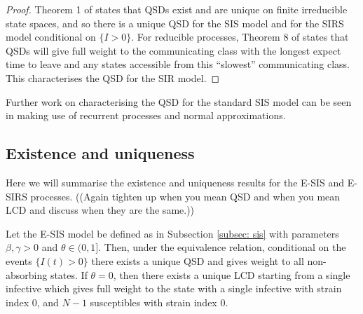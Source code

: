 \documentclass[smallextended]{svjour3}       %
\begin{document}
\begin{proof}
Theorem 1 of \cite{vanDoorn2008} states that QSDs exist and are unique on finite irreducible state spaces, and so there is a unique QSD for the SIS model and for the SIRS model conditional on $\{I > 0\}$. For reducible processes, Theorem 8 of \cite{vanDoorn2008} states that QSDs will give full weight to the communicating class with the longest expect time to leave and any states accessible from this ``slowest'' communicating class. This characterises the QSD for the SIR model.
\end{proof}

Further work on characterising the QSD for the standard SIS model can be seen in \cite{Nasell1999,clancy2003} making use of recurrent processes and normal approximations.

\subsection{Existence and uniqueness}\label{subsec: e and u}
Here we will summarise the existence and uniqueness results for the E-SIS and E-SIRS processes. ((Again tighten up when you mean QSD and when you mean LCD and discuss when they are the same.))
\begin{mythm}\label{thm: eu SIStr}
	Let the E-SIS model be defined as in Subsection \ref{subsec: sis} with parameters $\beta, \gamma > 0$ and $\theta \in (0,1]$. Then, under the equivalence relation, conditional on the events $\{I(t) > 0\}$ there exists a unique QSD
	and gives weight to all non-absorbing states. If $\theta = 0$, then there exists a unique LCD starting from a single infective
which gives full weight to the state with a single infective with strain index $0$, and $N-1$ susceptibles with strain index 0.
\end{mythm}
\end{document}
